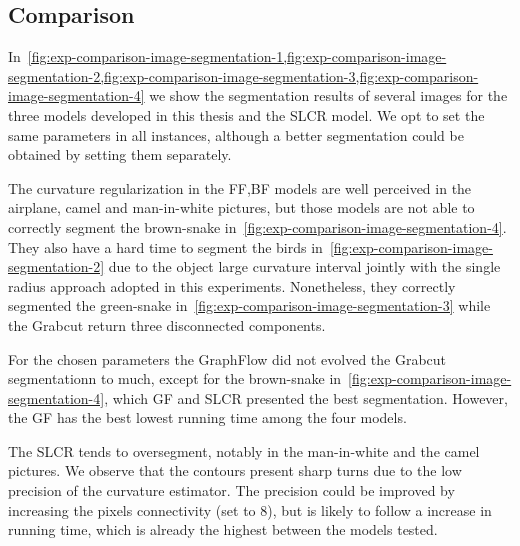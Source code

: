 \subsection{Comparison}

In~\cref{fig:exp-comparison-image-segmentation-1,fig:exp-comparison-image-segmentation-2,fig:exp-comparison-image-segmentation-3,fig:exp-comparison-image-segmentation-4} we show the segmentation results of several images for the three models developed in this thesis and the SLCR model. We opt to set the same parameters in all instances, although a better segmentation could be obtained by setting them separately.

The curvature regularization in the FF,BF models are well perceived in the airplane, camel and man-in-white pictures, but those models are not able to correctly segment the brown-snake in~\cref{fig:exp-comparison-image-segmentation-4}. They also have a hard time to segment the birds in~\cref{fig:exp-comparison-image-segmentation-2} due to the object large curvature interval jointly with the single radius approach adopted in this experiments. Nonetheless, they correctly segmented the green-snake in~\cref{fig:exp-comparison-image-segmentation-3} while the Grabcut return three disconnected components.

For the chosen parameters the GraphFlow did not evolved the Grabcut segmentationn to much, except for the brown-snake in~\cref{fig:exp-comparison-image-segmentation-4}, which GF and SLCR presented the best segmentation. However, the GF has the best lowest running time among the four models.

The SLCR tends to oversegment, notably in the man-in-white and the camel pictures. We observe that the contours present sharp turns due to the low precision of the curvature estimator. The precision could be improved by increasing the pixels connectivity (set to $8$), but is likely to follow a increase in running time, which is already the highest between the models tested.





\newcommand\segComparisonGF[2]{figures/chapter9/segmentation/comparison/#1/#2/alpha-0.0002/beta-1.0/gamma-3.0/radius-7}
\newcommand\segComparisonFF[2]{figures/chapter9/segmentation/comparison/#1/#2/alpha-0.5/beta-1.0/gamma-3.0/radius-7}
\newcommand\segComparisonScho[2]{figures/chapter9/segmentation/comparison/#1/lambda-2.0/gamma-1.0/#2}

